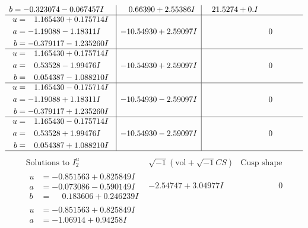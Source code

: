 \documentclass[1p]{elsarticle_modified}
\theoremstyle{definition}
\newcommand{\I}{\sqrt{-1}}
\begin{document}
$$\begin{array}{c|c|c}
\begin{aligned}
b &= -0.323074 - 0.067457 I\end{aligned}
 & \phantom{-}0.66390 + 2.55386 I & \phantom{-}21.5274 + 0. I\phantom{ +0.000000I} \\ \hline\begin{aligned}
u &= \phantom{-}1.165430 + 0.175714 I \\
a &= -1.19088 - 1.18311 I \\
b &= -0.379117 - 1.235260 I\end{aligned}
 & -10.54930 + 2.59097 I & \phantom{-0.000000 } 0 \\ \hline\begin{aligned}
u &= \phantom{-}1.165430 + 0.175714 I \\
a &= \phantom{-}0.53528 - 1.99476 I \\
b &= \phantom{-}0.054387 - 1.088210 I\end{aligned}
 & -10.54930 + 2.59097 I & \phantom{-0.000000 } 0 \\ \hline\begin{aligned}
u &= \phantom{-}1.165430 - 0.175714 I \\
a &= -1.19088 + 1.18311 I \\
b &= -0.379117 + 1.235260 I\end{aligned}
 & -10.54930 - 2.59097 I & \phantom{-0.000000 } 0 \\ \hline\begin{aligned}
u &= \phantom{-}1.165430 - 0.175714 I \\
a &= \phantom{-}0.53528 + 1.99476 I \\
b &= \phantom{-}0.054387 + 1.088210 I\end{aligned}
 & -10.54930 - 2.59097 I & \phantom{-0.000000 } 0\\
 \hline 
 \end{array}$$\newpage$$\begin{array}{c|c|c}  
\text{Solutions to }I^u_{2}& \I (\text{vol} + \sqrt{-1}CS) & \text{Cusp shape}\\
 \hline 
\begin{aligned}
u &= -0.851563 + 0.825849 I \\
a &= -0.073086 - 0.590149 I \\
b &= \phantom{-}0.183606 + 0.246239 I\end{aligned}
 & -2.54747 + 3.04977 I & \phantom{-0.000000 } 0 \\ \hline\begin{aligned}
u &= -0.851563 + 0.825849 I \\
a &= -1.06914 + 0.94258 I \\

\end{aligned}
\end{array}$$
\end{document}

